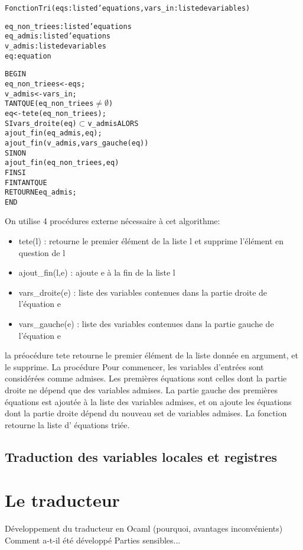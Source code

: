 \begin{alltt}
Fonction Tri (eqs: liste d'equations, vars\_in: liste de variables)

eq\_non\_triees : liste d'equations
eq\_admis : liste d'equations
v\_admis : liste de variables 
eq : equation

BEGIN
 eq\_non\_triees <- eqs;
 v\_admis <- vars\_in;
 TANT QUE (eq\_non\_triees \(\neq \emptyset \)) 
    eq <- tete(eq\_non\_triees);
    SI vars\_droite(eq) \(\subset\) v\_admis ALORS
       ajout\_fin(eq\_admis, eq);
       ajout\_fin(v\_admis, vars\_gauche(eq))
    SINON
       ajout\_fin(eq\_non\_triees, eq)
    FIN SI
 FIN TANT QUE
 RETOURNE eq\_admis;
END

\end{alltt}

On utilise 4 procédures externe nécessaire à cet algorithme:
\begin{itemize}
\item tete(l) : retourne le premier élément de la liste l et supprime l'élément
  en question de l
\item ajout\_fin(l,e) : ajoute e à la fin de la liste l
\item vars\_droite(e) : liste des variables contenues dans la partie droite de
  l'équation e
\item vars\_gauche(e) : liste des variables contenues dans la partie gauche de
  l'équation e
\end{itemize}
la préocédure tete retourne le premier élément de la liste donnée en argument,
et le supprime. La procédure 
Pour commencer, les variables d'entrées sont considérées comme admises. Les
premières équations sont celles dont la partie droite ne dépend que des
variables admises. La partie gauche des premières équations est ajoutée à la
liste des variables admises, et on ajoute les équations dont la partie droite
dépend du nouveau set de variables admises. La fonction retourne la liste d'
équations triée.

\subsection{Traduction des variables locales et registres}

\section{Le traducteur}
Développement du traducteur en Ocaml (pourquoi, avantages
inconvénients)
Comment a-t-il été développé
Parties sensibles...
